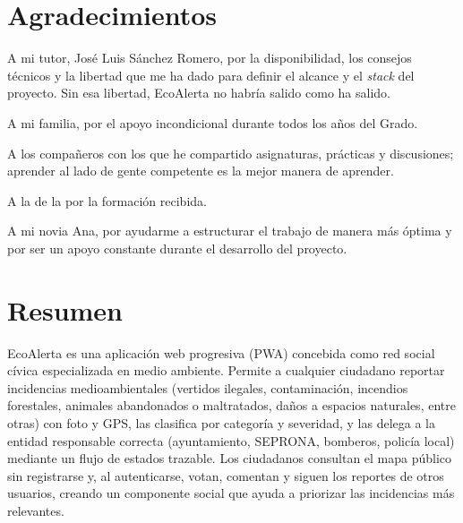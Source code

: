 
\chapter*{Agradecimientos}

A mi tutor, José Luis Sánchez Romero, por la disponibilidad, los consejos técnicos y la libertad que me ha dado para definir el alcance y el \textit{stack} del proyecto. Sin esa libertad, EcoAlerta no habría salido como ha salido.

A mi familia, por el apoyo incondicional durante todos los años del Grado.

A los compañeros con los que he compartido asignaturas, prácticas y discusiones; aprender al lado de gente competente es la mejor manera de aprender.

A la \EPSfacultad{} de la \EPSuniversidad{} por la formación recibida.

A mi novia Ana, por ayudarme a estructurar el trabajo de manera más óptima y por ser un apoyo constante durante el desarrollo del proyecto.

\clearpage


\chapter*{Resumen}

EcoAlerta es una aplicación web progresiva (PWA) concebida como red social cívica especializada en medio ambiente. Permite a cualquier ciudadano reportar incidencias medioambientales (vertidos ilegales, contaminación, incendios forestales, animales abandonados o maltratados, daños a espacios naturales, entre otras) con foto y GPS, las clasifica por categoría y severidad, y las delega a la entidad responsable correcta (ayuntamiento, SEPRONA, bomberos, policía local) mediante un flujo de estados trazable. Los ciudadanos consultan el mapa público sin registrarse y, al autenticarse, votan, comentan y siguen los reportes de otros usuarios, creando un componente social que ayuda a priorizar las incidencias más relevantes.

